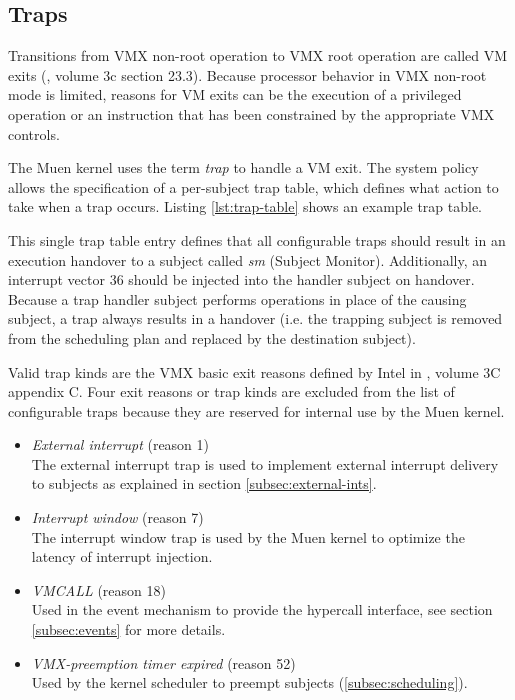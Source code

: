 \subsection{Traps}\label{subsec:traps}
Transitions from VMX non-root operation to VMX root operation are called VM
exits (\cite{IntelSDM}, volume 3c section 23.3). Because processor behavior in
VMX non-root mode is limited, reasons for VM exits can be the execution of a
privileged operation or an instruction that has been constrained by the
appropriate VMX controls.

The Muen kernel uses the term \emph{trap} to handle a VM exit. The system policy
allows the specification of a per-subject trap table, which defines what action
to take when a trap occurs. Listing \ref{lst:trap-table} shows an example trap
table.



This single trap table entry defines that all configurable traps should result
in an execution handover to a subject called \emph{sm} (Subject
Monitor). Additionally, an interrupt vector 36 should be injected into
the handler subject on handover. Because a trap handler subject performs
operations in place of the causing subject, a trap always results in a handover
(i.e. the trapping subject is removed from the scheduling plan and replaced by
the destination subject).

Valid trap kinds are the VMX basic exit reasons defined by Intel in
\cite{IntelSDM}, volume 3C appendix C. Four exit reasons or trap kinds are
excluded from the list of configurable traps because they are reserved for
internal use by the Muen kernel.

\begin{itemize}
	\item \emph{External interrupt} (reason 1)\\
		The external interrupt trap is used to implement external interrupt
		delivery to subjects as explained in section \ref{subsec:external-ints}.
	\item \emph{Interrupt window} (reason 7)\\
		The interrupt window trap is used by the Muen kernel to optimize the
		latency of interrupt injection.
	\item \emph{VMCALL} (reason 18)\\
		Used in the event mechanism to provide the hypercall interface, see
		section \ref{subsec:events} for more details.
	\item \emph{VMX-preemption timer expired} (reason 52)\\
		Used by the kernel scheduler to preempt subjects
		(\ref{subsec:scheduling}).
\end{itemize}

